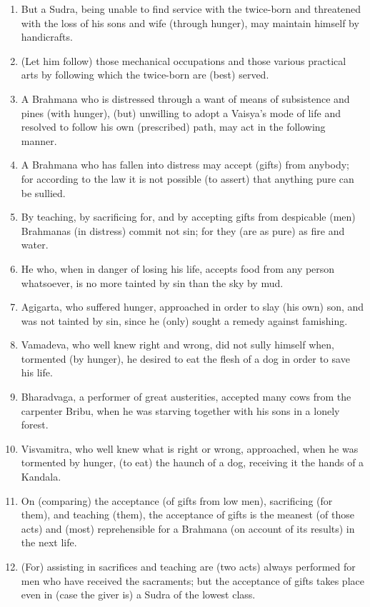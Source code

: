 \begin{enumerate}
\item But a Sudra, being unable to find service with the twice-born and threatened with the loss of his sons and wife (through hunger), may maintain himself by handicrafts.
\item (Let him follow) those mechanical occupations and those various practical arts by following which the twice-born are (best) served.
\item A Brahmana who is distressed through a want of means of subsistence and pines (with hunger), (but) unwilling to adopt a Vaisya's mode of life and resolved to follow his own (prescribed) path, may act in the following manner.
\item A Brahmana who has fallen into distress may accept (gifts) from anybody; for according to the law it is not possible (to assert) that anything pure can be sullied.
\item By teaching, by sacrificing for, and by accepting gifts from despicable (men) Brahmanas (in distress) commit not sin; for they (are as pure) as fire and water.
\item He who, when in danger of losing his life, accepts food from any person whatsoever, is no more tainted by sin than the sky by mud.
\item Agigarta, who suffered hunger, approached in order to slay (his own) son, and was not tainted by sin, since he (only) sought a remedy against famishing.
\item Vamadeva, who well knew right and wrong, did not sully himself when, tormented (by hunger), he desired to eat the flesh of a dog in order to save his life.
\item Bharadvaga, a performer of great austerities, accepted many cows from the carpenter Bribu, when he was starving together with his sons in a lonely forest.
\item Visvamitra, who well knew what is right or wrong, approached, when he was tormented by hunger, (to eat) the haunch of a dog, receiving it the hands of a Kandala.
\item On (comparing) the acceptance (of gifts from low men), sacrificing (for them), and teaching (them), the acceptance of gifts is the meanest (of those acts) and (most) reprehensible for a Brahmana (on account of its results) in the next life.
\item (For) assisting in sacrifices and teaching are (two acts) always performed for men who have received the sacraments; but the acceptance of gifts takes place even in (case the giver is) a Sudra of the lowest class.

\end{enumerate}
